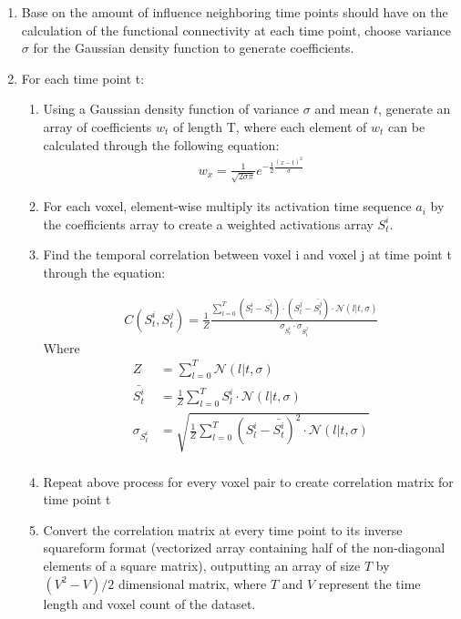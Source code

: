 \documentclass[11pt]{article}
\begin{document}
\begin{enumerate}
\item Base on the amount of influence neighboring time points should have on the calculation of the functional connectivity at each time point, choose variance $\sigma$ for the Gaussian density function to generate coefficients.

\item For each time point t:
\begin{enumerate}
\item Using a Gaussian density function of variance $\sigma$ and mean $t$, generate an array of coefficients $w_t$ of length T, where each element of $w_t$ can be calculated through the following equation:
\begin{align*}
w_x = \frac{1}{\sqrt{2\sigma\pi}}e^{-\frac12 \frac{(x-t)^2}{\sigma}}
\end{align*}

\item For each voxel, element-wise multiply its activation time sequence $a_i$ by the coefficients array to create a weighted activations array $S^i_t$.

\item Find the temporal correlation between voxel i and voxel j at time point t through the equation:

\begin{align*}
C(S^i_t,S^j_t) = \frac{1}{Z}\frac{\sum_{l=0}^T (S_l^i - \bar{S^i_t})\cdot(S^j_l - \bar{S^j_t})\cdot \mathcal{N}(l|t,\sigma)}{\sigma_{S_t^i} \cdot \sigma_{S_t^j}}
\end{align*}
Where
\begin{align*}
Z &= \sum_{l=0}^T \mathcal{N}(l|t,\sigma)\\
\bar{S^i_t} &=\frac{1}{Z} \sum_{l=0}^T S^i_l \cdot \mathcal{N}(l|t,\sigma)\\
\sigma_{S_t^i} &=\sqrt{ \frac{1}{Z}\sum_{l=0}^T (S_l^i-\bar{S_t^i})^2 \cdot \mathcal{N}(l|t,\sigma)}\\
\end{align*}
\item Repeat above process for every voxel pair to create correlation matrix for time point t
\item Convert the correlation matrix at every time point to its inverse squareform format (vectorized array containing half of the non-diagonal elements of a square matrix), outputting an array of size $T$ by $(V^2-V)/2$ dimensional matrix, where $T$ and $V$ represent the time length and voxel count of the dataset.
\end{enumerate}
\end{enumerate}
\end{document}
